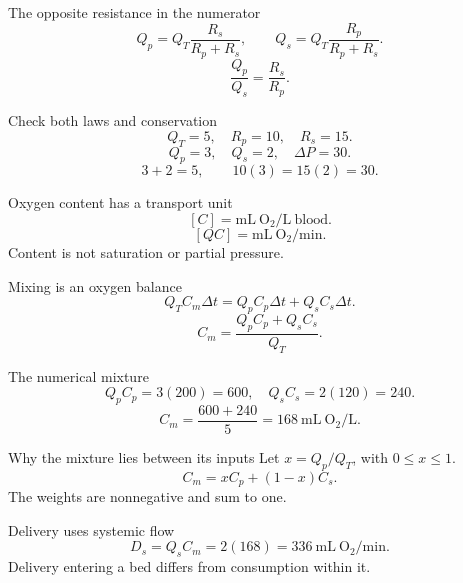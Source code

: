 \documentclass[aspectratio=169,11pt]{beamer}
\newcommand{\notestarget}{notes.pdf}\newcommand{\noteslabel}{Notes}
\begin{document}
\renewcommand{\notestarget}{notes.pdf\#note-solve-the-parallel-flow-equations}
\begin{frame}[t,fragile,label=slide-the-opposite-resistance-in-the-numerator]{The opposite resistance in the numerator}
\[Q_p=Q_T\frac{R_s}{R_p+R_s},\qquad Q_s=Q_T\frac{R_p}{R_p+R_s}.\]\pause{}\[\frac{Q_p}{Q_s}=\frac{R_s}{R_p}.\]
\end{frame}
\renewcommand{\notestarget}{notes.pdf\#note-solve-the-parallel-flow-equations}
\begin{frame}[t,fragile,label=slide-check-both-laws-and-conservation]{Check both laws and conservation}
\[Q_T=5,\quad R_p=10,\quad R_s=15.\]\pause{}\[Q_p=3,\quad Q_s=2,\quad \Delta P=30.\]\pause{}\[3+2=5,\qquad10(3)=15(2)=30.\]
\end{frame}
\renewcommand{\notestarget}{notes.pdf\#note-mix-contents-by-conserving-oxygen}
\begin{frame}[t,fragile,label=slide-oxygen-content-has-a-transport-unit]{Oxygen content has a transport unit}
\[[C]=\mathrm{mL\ O_2/L\ blood}.\]\pause{}\[[QC]=\mathrm{mL\ O_2/min}.\]\pause{} Content is not saturation or partial pressure.
\end{frame}
\renewcommand{\notestarget}{notes.pdf\#note-mix-contents-by-conserving-oxygen}
\begin{frame}[t,fragile,label=slide-mixing-is-an-oxygen-balance]{Mixing is an oxygen balance}
\[Q_TC_m\Delta t=Q_pC_p\Delta t+Q_sC_s\Delta t.\]\pause{}\[C_m=\frac{Q_pC_p+Q_sC_s}{Q_T}.\]
\end{frame}
\renewcommand{\notestarget}{notes.pdf\#note-mix-contents-by-conserving-oxygen}
\begin{frame}[t,fragile,label=slide-the-numerical-mixture]{The numerical mixture}
\[Q_pC_p=3(200)=600,\quad Q_sC_s=2(120)=240.\]\pause{}\[C_m=\frac{600+240}{5}=168\ \mathrm{mL\ O_2/L}.\]
\end{frame}
\renewcommand{\notestarget}{notes.pdf\#note-mix-contents-by-conserving-oxygen}
\begin{frame}[t,fragile,label=slide-why-the-mixture-lies-between-its-inputs]{Why the mixture lies between its inputs}
Let $x=Q_p/Q_T$, with $0\le x\le1$.\pause{}\[C_m=xC_p+(1-x)C_s.\]\pause{} The weights are nonnegative and sum to one.
\end{frame}
\renewcommand{\notestarget}{notes.pdf\#note-content-and-delivery-enter-as-a-product}
\begin{frame}[t,fragile,label=slide-delivery-uses-systemic-flow]{Delivery uses systemic flow}
\[D_s=Q_sC_m=2(168)=336\ \mathrm{mL\ O_2/min}.\]\pause{} Delivery entering a bed differs from consumption within it.
\end{frame}
\end{document}
